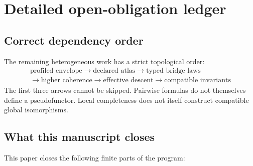 \section{Detailed open-obligation ledger}
\label{app:block14-open-program}

\subsection{Correct dependency order}

The remaining heterogeneous work has a strict topological order:
\[
\boxed{
\begin{gathered}
\text{profiled envelope}
\longrightarrow
\text{declared atlas}
\longrightarrow
\text{typed bridge laws}\\[-1pt]
\longrightarrow
\text{higher coherence}
\longrightarrow
\text{effective descent}
\longrightarrow
\text{compatible invariants}
\end{gathered}}
\]
The first three arrows cannot be skipped. Pairwise formulas do not themselves define a pseudofunctor. Local completeness does not itself construct compatible global isomorphisms.

\subsection{What this manuscript closes}

This paper closes the following finite parts of the program:

